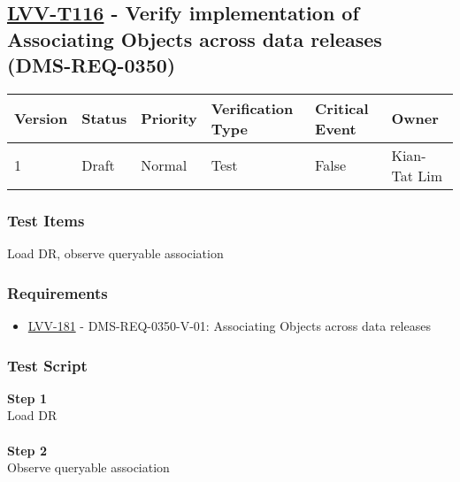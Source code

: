 \hypertarget{lvv-t116---verify-implementation-of-associating-objects-across-data-releases-dms-req-0350}{%
\subsection{\texorpdfstring{\href{https://jira.lsstcorp.org/secure/Tests.jspa\#/testCase/LVV-T116}{LVV-T116}
- Verify implementation of Associating Objects across data releases
(DMS-REQ-0350)}{LVV-T116 - Verify implementation of Associating Objects across data releases (DMS-REQ-0350)}}\label{lvv-t116---verify-implementation-of-associating-objects-across-data-releases-dms-req-0350}}

\begin{longtable}[]{@{}llllll@{}}
\toprule
Version & Status & Priority & Verification Type & Critical Event &
Owner\tabularnewline
\midrule
\endhead
1 & Draft & Normal & Test & False & Kian-Tat Lim\tabularnewline
\bottomrule
\end{longtable}

\hypertarget{test-items-92}{%
\subsubsection{Test Items}\label{test-items-92}}

Load DR, observe queryable association

\hypertarget{requirements-93}{%
\subsubsection{Requirements}\label{requirements-93}}

\begin{itemize}
\tightlist
\item
  \href{https://jira.lsstcorp.org/browse/LVV-181}{LVV-181} -
  DMS-REQ-0350-V-01: Associating Objects across data releases
\end{itemize}

\hypertarget{test-script-93}{%
\subsubsection{Test Script}\label{test-script-93}}

\textbf{Step 1}\\
Load DR\\
~\\
\textbf{Step 2}\\
Observe queryable association\\
~\\

